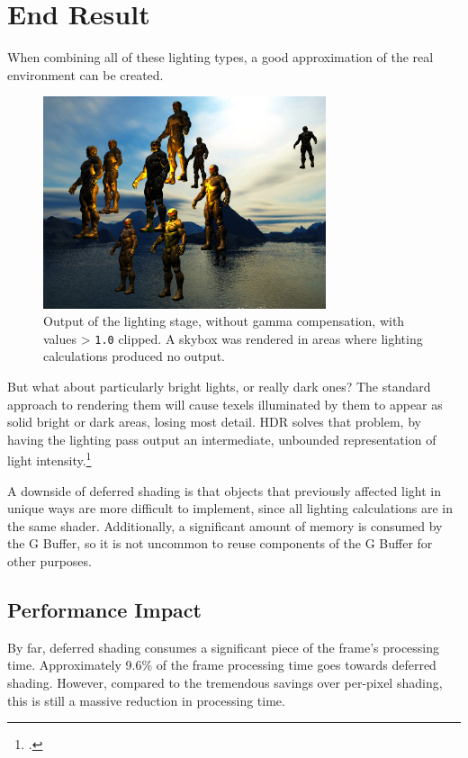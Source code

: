 \documentclass[11pt, oneside]{report}
\begin{document}
\section{End Result}
When combining all of these lighting types, a good approximation of the real environment can be created.

\begin{figure}[!htbp]
   \centering
   \includegraphics[width=0.74\textwidth]{images/lighting_out.png}
   \caption{Output of the lighting stage, without gamma compensation, with values > \texttt{1.0} clipped. A \gls{skybox} was rendered in areas where lighting calculations produced no output.}
   \label{fig:f14}
\end{figure}

But what about particularly bright lights, or really dark ones? The standard approach to rendering them will cause \glspl{texel} illuminated by them to appear as solid bright or dark areas, losing most detail. \gls{HDR} solves that problem, by having the lighting pass output an intermediate, unbounded representation of light intensity.\footcite{trebilco-deferred}

A downside of deferred shading is that objects that previously affected light in unique ways are more difficult to implement, since all lighting calculations are in the same shader. Additionally, a significant amount of memory is consumed by the \gls{G Buffer}, so it is not uncommon to reuse components of the \gls{G Buffer} for other purposes.

\subsection{Performance Impact}
By far, deferred shading consumes a significant piece of the frame's processing time. Approximately 9.6\% of the frame processing time goes towards deferred shading. However, compared to the tremendous savings over per-pixel shading, this is still a massive reduction in processing time.
\end{document}
